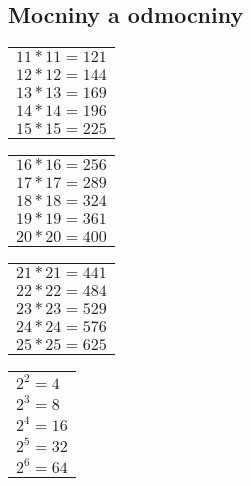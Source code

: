 \documentclass[vyfuk,\classoptions]{fksgeneric}
\begin{document}
\subsection{Mocniny a odmocniny}

\begin{framed}
\begin{multicols}{4}

\begin{center}
\begin{tabular}{l}
$11*11=121$\\
$12*12=144$\\
$13*13=169$\\
$14*14=196$\\
$15*15=225$
\end{tabular}
\end{center}

\columnbreak

\begin{center}
\begin{tabular}{l}
$16*16=256$\\
$17*17=289$\\
$18*18=324$\\
$19*19=361$\\
$20*20=400$
\end{tabular}
\end{center}

\columnbreak

\begin{center}
\begin{tabular}{l}
$21*21=441$\\
$22*22=484$\\
$23*23=529$\\
$24*24=576$\\
$25*25=625$
\end{tabular}
\end{center}

\columnbreak

\begin{center}
\begin{tabular}{l}
$2^2=4$\\
$2^3=8$\\
$2^4=16$\\
$2^5=32$\\
$2^6=64$
\end{tabular}
\end{center}

\end{multicols}\vspace{-\baselineskip}


\end{framed}
\end{document}
